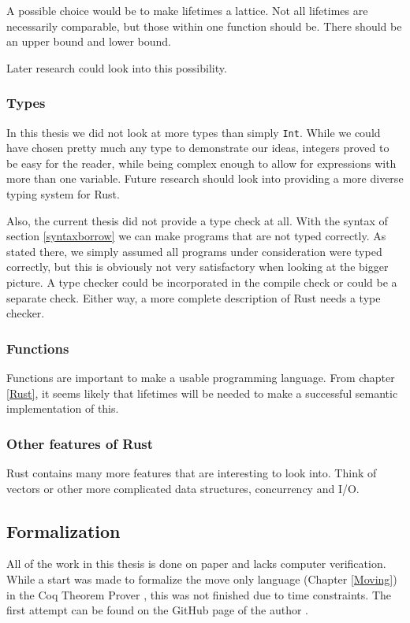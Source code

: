 A possible choice would be to make lifetimes a lattice. Not all lifetimes are necessarily comparable, but those within one function should be. There should be an upper bound and lower bound. 

Later research could look into this possibility. 

\subsubsection*{Types}
In this thesis we did not look at more types than simply \texttt{Int}. While we could have chosen pretty much any type to demonstrate our ideas, integers proved to be easy for the reader, while being complex enough to allow for expressions with more than one variable. Future research should look into providing a more diverse typing system for Rust.

Also, the current thesis did not provide a type check at all. With the syntax of section \ref{syntaxborrow} we can make programs that are not typed correctly. As stated there, we simply assumed all programs under consideration were typed correctly, but this is obviously not very satisfactory when looking at the bigger picture. A type checker could be incorporated in the compile check or could be a separate check. Either way, a more complete description of Rust needs a type checker. 

\subsubsection*{Functions}
Functions are important to make a usable programming language. From chapter \ref{Rust}, it seems likely that lifetimes will be needed to make a successful semantic implementation of this. 

\subsubsection*{Other features of Rust}
Rust contains many more features that are interesting to look into. Think of vectors or other more complicated data structures, concurrency and I/O. 

\subsection{Formalization}
All of the work in this thesis is done on paper and lacks computer verification. While a start was made to formalize the move only language (Chapter \ref{Moving}) in the Coq Theorem Prover \citep{barras1997coq}, this was not finished due to time constraints. The first attempt can be found on the GitHub page of the author \citep{github}. 

